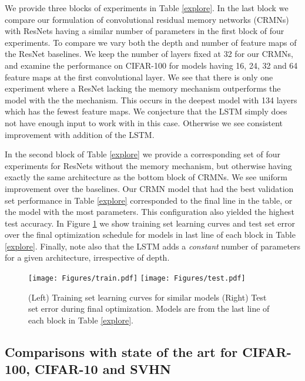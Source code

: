 \documentclass{article}
\begin{document}
We provide three blocks of experiments in Table \ref{explore}. In the last block
we compare our formulation of convolutional residual memory networks (CRMNs) with ResNets having a similar number of parameters in the first block of four experiments. To compare we vary both the depth and number of feature maps of the ResNet baselines. We keep the number of layers fixed at 32 for our CRMNs, and examine the performance on CIFAR-100 for models having 16, 24, 32 and 64 feature maps at the first convolutional layer.  We see that there is only one experiment where a ResNet lacking the memory mechanism outperforms the model with the the mechanism. This occurs in the deepest model with 134 layers which has the fewest feature maps. We conjecture that the LSTM simply does not have enough input to work with in this case. Otherwise we see consistent improvement with addition of the LSTM.

In the second block of Table \ref{explore} we provide a corresponding set of four experiments for ResNets without the memory mechanism, but otherwise having exactly the same architecture as the bottom block of CRMNs. We see uniform improvement over the baselines.
%
Our CRMN model that had the best validation set performance in Table \ref{explore} corresponded to the final line in the table, or the model with the most parameters. This configuration also yielded the highest test accuracy.
%
In Figure \ref{fig:curves} we show training set learning curves and test set error over the final optimization schedule for models in last line of each block in Table \ref{explore}.
%
Finally, note also that the LSTM adds a \emph{constant} number of parameters for a given architecture, irrespective of depth.

\begin{figure}[htbp]
  \centering
    \texttt{[image: Figures/train.pdf]} \hspace{.2cm}
     \texttt{[image: Figures/test.pdf]}
  \caption[Learning Curves]{(Left) Training set learning curves for similar models (Right) Test set error during final optimization. Models are from the last line of each block in Table \ref{explore}.}
  \label{fig:curves}
\end{figure}

\subsection{Comparisons with state of the art for CIFAR-100, CIFAR-10 and SVHN}
\end{document}
